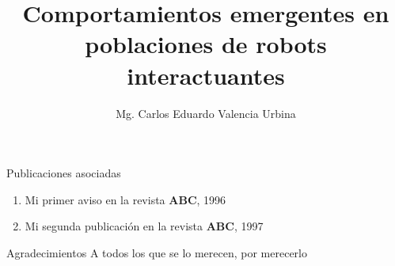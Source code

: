\documentclass[12pt,screen,twoside,pagebackref]{ibtesis}
\title{Comportamientos emergentes en poblaciones de robots interactuantes}
\author{Mg. Carlos Eduardo Valencia Urbina}
\begin{document}

\begin{preliminary}



\begin{abreviaturas}
\end{abreviaturas}

\tableofcontents                %

\listoffigures                  %

\listoftables                   %



\end{preliminary}






\appendix


\begin{biblio}

\end{biblio}


\begin{postliminary}

\begin{seccion}{Publicaciones asociadas}
  \begin{enumerate}
  \item Mi primer aviso en la revista \textbf{ABC}, 1996
  \item Mi segunda publicaci\'{o}n en la revista \textbf{ABC}, 1997
  \end{enumerate}
\end{seccion}

\begin{seccion}{Agradecimientos}
A todos los que se lo merecen, por merecerlo
\end{seccion}

\end{postliminary}
\end{document}
